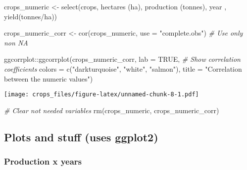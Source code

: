\documentclass[
]{article}
\newenvironment{Shaded}{\begin{snugshade}}{\end{snugshade}}
\newcommand{\AttributeTok}[1]{\textcolor[rgb]{0.77,0.63,0.00}{#1}}
\newcommand{\CommentTok}[1]{\textcolor[rgb]{0.56,0.35,0.01}{\textit{#1}}}
\newcommand{\ConstantTok}[1]{\textcolor[rgb]{0.00,0.00,0.00}{#1}}
\newcommand{\FunctionTok}[1]{\textcolor[rgb]{0.00,0.00,0.00}{#1}}
\newcommand{\NormalTok}[1]{#1}
\newcommand{\OtherTok}[1]{\textcolor[rgb]{0.56,0.35,0.01}{#1}}
\newcommand{\SpecialCharTok}[1]{\textcolor[rgb]{0.00,0.00,0.00}{#1}}
\newcommand{\StringTok}[1]{\textcolor[rgb]{0.31,0.60,0.02}{#1}}
\begin{document}
\begin{Shaded}
\begin{Highlighting}[]
\NormalTok{crops\_numeric }\OtherTok{\textless{}{-}} \FunctionTok{select}\NormalTok{(crops,}
                        \StringTok{\textasciigrave{}}\AttributeTok{hectares (ha)}\StringTok{\textasciigrave{}}\NormalTok{,}
                        \StringTok{\textasciigrave{}}\AttributeTok{production (tonnes)}\StringTok{\textasciigrave{}}\NormalTok{,}
\NormalTok{                        year ,}
                        \StringTok{\textasciigrave{}}\AttributeTok{yield(tonnes/ha)}\StringTok{\textasciigrave{}}\NormalTok{)}

\NormalTok{crops\_numeric\_corr }\OtherTok{\textless{}{-}} \FunctionTok{cor}\NormalTok{(crops\_numeric, }\AttributeTok{use =} \StringTok{"complete.obs"}\NormalTok{) }\CommentTok{\# Use only non NA}

\NormalTok{ggcorrplot}\SpecialCharTok{::}\FunctionTok{ggcorrplot}\NormalTok{(crops\_numeric\_corr,}
                       \AttributeTok{lab =} \ConstantTok{TRUE}\NormalTok{, }\CommentTok{\# Show correlation coefficients}
                       \AttributeTok{colors =} \FunctionTok{c}\NormalTok{(}\StringTok{"darkturquoise"}\NormalTok{, }\StringTok{"white"}\NormalTok{, }\StringTok{"salmon"}\NormalTok{),}
                       \AttributeTok{title =} \StringTok{"Correlation between the numeric values"}\NormalTok{)}
\end{Highlighting}
\end{Shaded}

\texttt{[image: crops\_files/figure-latex/unnamed-chunk-8-1.pdf]}

\begin{Shaded}
\begin{Highlighting}[]
\CommentTok{\# Clear not needed variables}
\FunctionTok{rm}\NormalTok{(crops\_numeric, crops\_numeric\_corr)}
\end{Highlighting}
\end{Shaded}

\hypertarget{plots-and-stuff-uses-ggplot2}{%
\subsection{Plots and stuff (uses
ggplot2)}\label{plots-and-stuff-uses-ggplot2}}

\hypertarget{production-x-years}{%
\subsubsection{Production x years}\label{production-x-years}}
\end{document}
